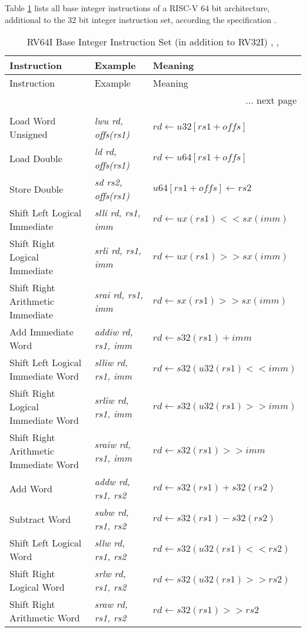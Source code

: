 
Table \ref{tab:ISA01bzzzz} lists all base integer instructions of a RISC-V 64 bit architecture, additional to the 32 bit integer instruction set, according the specification \cite{riscvisa03}. 
\begin{longtable}{|m{3.5cm}<{\raggedright} |m{3cm}<{\raggedright} |m{5.5cm}<{\raggedright} |} %
\caption{RV64I Base Integer Instruction Set (in addition to RV32I) \cite{riscvisa01}, \cite{riscvisa02}, \cite{riscvisa03}} \\
\hline
Instruction & Example & Meaning    \\
\hline
\endfirsthead
Instruction  & Example  & Meaning    \\
\hline
\endhead
\multicolumn{3}{r}{... next page}\\
\endfoot
\hline
\multicolumn{3}{r}{End of table.} \\
\endlastfoot
Load Word Unsigned & \textit{lwu rd, offs(rs1)} & $rd \leftarrow u32[rs1 + offs]$ \\
\hline
Load Double & \textit{ld rd, offs(rs1)} & $rd \leftarrow u64[rs1 + offs]$ \\
\hline
Store Double & \textit{sd rs2, offs(rs1)} & $u64[rs1 + offs] \leftarrow rs2$ \\
\hline
Shift Left Logical Immediate & \textit{slli rd, rs1, imm} & $rd \leftarrow ux(rs1) << sx(imm)$ \\
\hline
Shift Right Logical Immediate & \textit{srli rd, rs1, imm} & $rd \leftarrow ux(rs1) >> sx(imm)$ \\
\hline
Shift Right Arithmetic Immediate & \textit{srai rd, rs1, imm} & $rd \leftarrow sx(rs1) >> sx(imm)$ \\
\hline
Add Immediate Word & \textit{addiw rd, rs1, imm} & $rd \leftarrow s32(rs1) + imm$ \\
\hline
Shift Left Logical Immediate Word & \textit{slliw rd, rs1, imm} & $rd \leftarrow s32(u32(rs1) << imm)$ \\
\hline
Shift Right Logical Immediate Word& \textit{srliw rd, rs1, imm} & $rd \leftarrow s32(u32(rs1) >> imm)$ \\
\hline
Shift Right Arithmetic Immediate Word& \textit{sraiw rd, rs1, imm} & $rd \leftarrow s32(rs1) >> imm$ \\
\hline
Add Word& \textit{addw rd, rs1, rs2} & $rd \leftarrow s32(rs1) + s32(rs2)$ \\
\hline
Subtract Word& \textit{subw rd, rs1, rs2} & $rd \leftarrow s32(rs1) - s32(rs2)$ \\
\hline
Shift Left Logical Word& \textit{sllw rd, rs1, rs2} & $rd \leftarrow s32(u32(rs1) << rs2)$ \\
\hline
Shift Right Logical Word& \textit{srlw rd, rs1, rs2} & $rd \leftarrow s32(u32(rs1) >> rs2)$ \\
\hline
Shift Right Arithmetic Word& \textit{sraw rd, rs1, rs2}  & $rd \leftarrow s32(rs1) >> rs2$
\label{tab:ISA01bzzzz}
\end{longtable}
